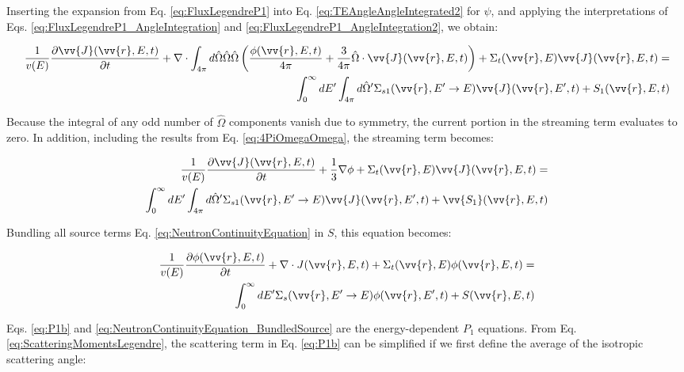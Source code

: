 \documentclass[10pt]{article}
\newcommand{\beqa}{\begin{equation}\begin{aligned}}
\newcommand{\eeqa}{\end{aligned}\end{equation}}
\newcommand{\hO}{\hat{\Omega}}
\newcommand{\spas}{(\vv{r},E,t)}
\begin{document}
\begin{flushleft}
Inserting the expansion from Eq. \ref{eq:FluxLegendreP1} into Eq. \ref{eq:TEAngleAngleIntegrated2} for \(\psi\), and applying the interpretations of Eqs. \ref{eq:FluxLegendreP1_AngleIntegration} and \ref{eq:FluxLegendreP1_AngleIntegration2}, we obtain:

\beqa
\label{eq:P1a}
\frac{1}{v(E)} \frac{\partial\vv{J}\spas}{\partial t} +
 \nabla\cdot \int_{4\pi}^{} d\hO   \hO  \hO  \left(\frac{\phi\spas}{4\pi} + \frac{3}{4\pi} \hO  \cdot\vv{J}\spas\right) + 
 \Sigma_t(\vv{r},E)\vv{J}\spas = \\
 \int_{0}^{\infty}dE' \int_{4\pi}^{ } d\hO  ' \Sigma_{s1}(\vv{r}, E'\rightarrow E)\vv{J}(\vv{r}, E', t) + S_1\spas
\eeqa

Because the integral of any odd number of \(\hO  \) components vanish due to symmetry, the current portion in the streaming term evaluates to zero. In addition, including the results from Eq. \ref{eq:4PiOmegaOmega}, the streaming term becomes:

\begin{equation}
\label{eq:P1b}
\begin{aligned}
\frac{1}{v(E)} \frac{\partial\vv{J}\spas}{\partial t} +
 \frac{1}{3}\nabla\phi + 
 \Sigma_t(\vv{r},E)\vv{J}\spas = \\
 \int_{0}^{\infty}dE' \int_{4\pi}^{ } d\hO  ' \Sigma_{s1}(\vv{r}, E'\rightarrow E)\vv{J}(\vv{r}, E', t) + \vv{S_1}\spas
\end{aligned}
\end{equation}

Bundling all source terms Eq. \ref{eq:NeutronContinuityEquation} in \(S\), this equation becomes:

\begin{equation}
\label{eq:NeutronContinuityEquation_BundledSource}
\begin{aligned}
\frac{1}{v(E)} \frac{\partial\phi\spas}{\partial t} +
 \nabla\cdot J\spas + 
 \Sigma_t(\vv{r},E)\phi\spas = \\
 \int_{0}^{\infty}dE' \Sigma_s(\vv{r}, E'\rightarrow E)\phi(\vv{r}, E', t) + S\spas\\
\end{aligned}
\end{equation}

Eqs. \ref{eq:P1b} and \ref{eq:NeutronContinuityEquation_BundledSource} are the energy-dependent \(P_1\) equations. From Eq. \ref{eq:ScatteringMomentsLegendre}, the scattering term in Eq. \ref{eq:P1b} can be simplified if we first define the average of the isotropic scattering angle:


\end{flushleft}
\end{document}
